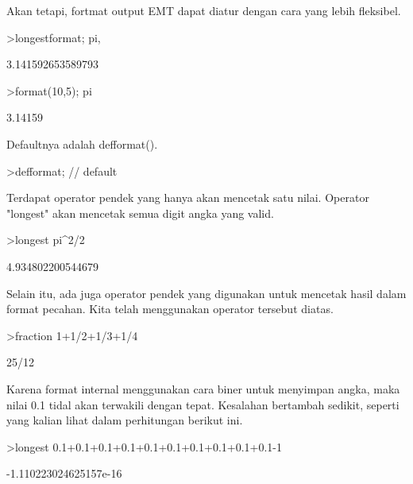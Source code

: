 \documentclass{article}
\begin{document}
\begin{eulernotebook}
\begin{eulercomment}
Akan tetapi, fortmat output EMT dapat diatur dengan cara yang lebih
fleksibel.
\end{eulercomment}
\begin{eulerprompt}
>longestformat; pi,
\end{eulerprompt}
\begin{euleroutput}
  3.141592653589793
\end{euleroutput}
\begin{eulerprompt}
>format(10,5); pi
\end{eulerprompt}
\begin{euleroutput}
    3.14159 
\end{euleroutput}
\begin{eulercomment}
Defaultnya adalah defformat().
\end{eulercomment}
\begin{eulerprompt}
>defformat; // default
\end{eulerprompt}
\begin{eulercomment}
Terdapat operator pendek yang hanya akan mencetak satu nilai. Operator
"longest" akan mencetak semua digit angka yang valid.
\end{eulercomment}
\begin{eulerprompt}
>longest pi^2/2
\end{eulerprompt}
\begin{euleroutput}
        4.934802200544679 
\end{euleroutput}
\begin{eulercomment}
Selain itu, ada juga operator pendek yang digunakan untuk mencetak
hasil dalam format pecahan. Kita telah menggunakan operator tersebut
diatas.
\end{eulercomment}
\begin{eulerprompt}
>fraction 1+1/2+1/3+1/4
\end{eulerprompt}
\begin{euleroutput}
  25/12
\end{euleroutput}
\begin{eulercomment}
Karena format internal menggunakan cara biner untuk menyimpan angka,
maka nilai 0.1 tidal akan terwakili dengan tepat. Kesalahan bertambah
sedikit, seperti yang kalian lihat dalam perhitungan berikut ini.
\end{eulercomment}
\begin{eulerprompt}
>longest 0.1+0.1+0.1+0.1+0.1+0.1+0.1+0.1+0.1+0.1-1
\end{eulerprompt}
\begin{euleroutput}
   -1.110223024625157e-16 

\end{euleroutput}
\end{eulernotebook}
\end{document}
